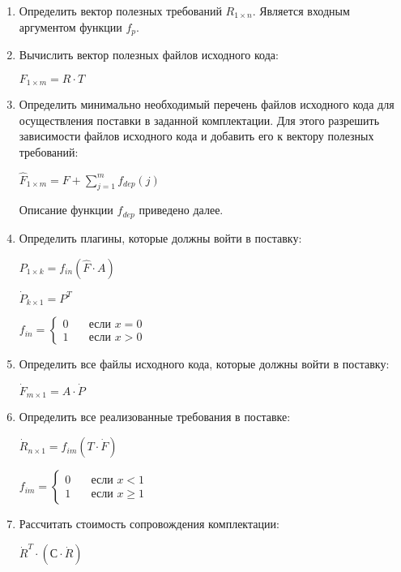 \begin{enumerate}
  \item Определить вектор полезных требований $R_{1 \times n}$. Является входным аргументом функции $f_{p}$.
  \item Вычислить вектор полезных файлов исходного кода:
  \begin{center}
    $F_{1 \times m} = R \cdot T$
  \end{center}
  \item Определить минимально необходимый перечень файлов исходного кода для осуществления поставки в заданной комплектации. Для этого разрешить зависимости файлов исходного кода и добавить его к вектору полезных требований: 
  \begin{center}
    $\displaystyle \hat{F}_{1 \times m} = F + \sum^{m}_{j = 1}f_{dep}(j)$
  \end{center}
  Описание функции $f_{dep}$ приведено далее.
  \item Определить плагины, которые должны войти в поставку:
  \begin{center}
    $P_{1 \times k} = f_{in}(\hat{F} \cdot A)$
  \end{center}
  \begin{center}
    $\dot{P}_{k \times 1} = P^{T}$
  \end{center}
  \begin{center}
    $
    f_{in} =
    \begin{cases}
      0 & \quad \text{если } x = 0 \\
      1 & \quad \text{если } x > 0
    \end{cases}
    $
  \end{center}
  \item Определить все файлы исходного кода, которые должны войти в поставку:
  \begin{center}
    $\dot{F}_{m \times 1} = A \cdot \dot{P}$
  \end{center}
  \item Определить все реализованные требования в поставке:
  \begin{center}
    $\dot{R}_{n \times 1} = f_{im}(T \cdot \dot{F})$
  \end{center}
  \begin{center}
    $
    f_{im} =
    \begin{cases}
      0 & \quad \text{если } x < 1 \\
      1 & \quad \text{если } x \geq 1
    \end{cases}
    $
  \end{center}
  \item Рассчитать стоимость сопровождения комплектации:
  \begin{center}
    $\dot{R}^{T} \cdot (С \cdot \dot{R})$
  \end{center}
\end{enumerate}

